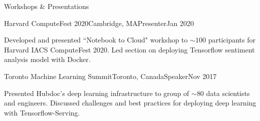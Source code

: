 \documentclass{resume} %
\begin{document}
\begin{rSection}{Workshops \& Presentations}

\begin{rSubsection}{Harvard ComputeFest 2020}{Cambridge, MA}{Presenter}{Jan 2020}

\item Developed and presented ``Notebook to Cloud" workshop to ${\sim} 100$ participants for Harvard IACS ComputeFest 2020. Led section on deploying Tensorflow sentiment analysis model with Docker.

\end{rSubsection}

\begin{rSubsection}{Toronto Machine Learning Summit}{Toronto, Canada}{Speaker}{Nov 2017}

\item Presented Hubdoc's deep learning infrastructure to group of ${\sim} 80$ data scientists and engineers. Discussed challenges and best practices for deploying deep learning with Tensorflow-Serving.

\end{rSubsection}

\end{rSection}
\end{document}
